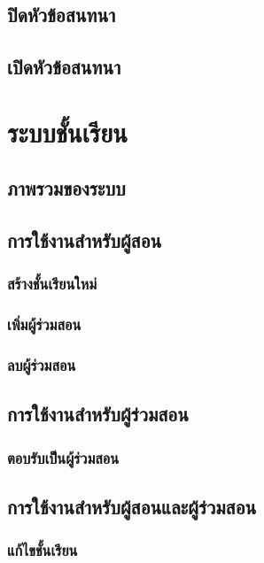 \documentclass[12pt,oneside]{book}
\begin{document}
\section{ปิดหัวข้อสนทนา}

\section{เปิดหัวข้อสนทนา}

\chapter{ระบบชั้นเรียน}

\section{ภาพรวมของระบบ}

\section{การใช้งานสำหรับผู้สอน}

\subsection{สร้างชั้นเรียนใหม่}

\subsection{เพิ่มผู้ร่วมสอน}

\subsection{ลบผู้ร่วมสอน}

\section{การใช้งานสำหรับผู้ร่วมสอน}

\subsection{ตอบรับเป็นผู้ร่วมสอน}

\section{การใช้งานสำหรับผู้สอนและผู้ร่วมสอน}

\subsection{แก้ไขชั้นเรียน}
\end{document}
